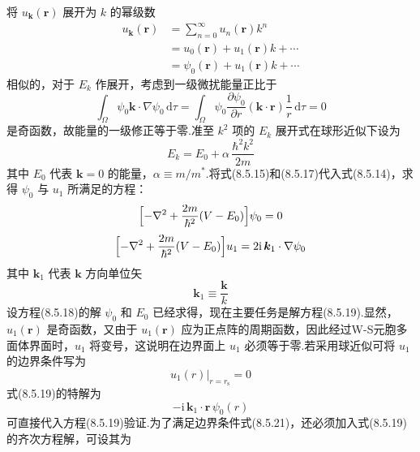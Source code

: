 将 $u_{\boldsymbol{k}}(\boldsymbol{r})$ 展开为 $k$ 的幂级数
\begin{equation}
\begin{aligned}
  u_{\boldsymbol{k}}(\boldsymbol{r})&=\sum_{n=0}^{\infty}u_{n}(\boldsymbol{r})k^{n}\\
  &=u_{0}(\boldsymbol{r})+u_{1}(\boldsymbol{r})k+\cdots\\
  &=\psi_{0}(\boldsymbol{r})+u_{1}(\boldsymbol{r})k+\cdots
\end{aligned}
\end{equation}
相似的，对于 $E_{k}$ 作展开，考虑到一级微扰能量正比于
\begin{equation}
  \int_{\Omega}\psi_{0}\boldsymbol{k}\cdot\nabla\psi_{0}\,\mathrm{d}\tau
  =\int_{\Omega}\psi_{0}\frac{\partial\psi_{0}}{\partial r}(\boldsymbol{k}\cdot\boldsymbol{r})\frac{1}{r}\,\mathrm{d}\tau=0
\end{equation}
是奇函数，故能量的一级修正等于零.准至 $k^{2}$ 项的 $E_{k}$ 展开式在球形近似下设为
\begin{equation}
  E_{k}=E_{0}+\alpha\,\frac{\hbar^{2}k^{2}}{2m}
\end{equation}
其中 $E_{0}$ 代表 $\boldsymbol{k}=0$ 的能量，$\alpha\equiv m/m^{*}$.将式(8.5.15)和(8.5.17)代入式(8.5.14)，求得 $\psi_{0}$ 与 $u_{1}$ 所满足的方程：
\begin{equation}
  \Bigl[-\nabla^{2}+\frac{2m}{\hbar^{2}}(V-E_{0})\Bigr]\psi_{0}=0
\end{equation}
\begin{equation}
  \Bigl[-\nabla^{2}+\frac{2m}{\hbar^{2}}(V-E_{0})\Bigr]u_{1}=2\mathrm{i}\,\boldsymbol{k}_{1}\cdot\nabla\psi_{0}
\end{equation}
其中 $\boldsymbol{k}_{1}$ 代表 $\boldsymbol{k}$ 方向单位矢
\begin{equation}
  \boldsymbol{k}_{1}\equiv\frac{\boldsymbol{k}}{k}
\end{equation}
设方程(8.5.18)的解 $\psi_{0}$ 和 $E_{0}$ 已经求得，现在主要任务是解方程(8.5.19).显然，$u_{1}(\boldsymbol{r})$ 是奇函数，又由于 $u_{1}(\boldsymbol{r})$ 应为正点阵的周期函数，因此经过W-S元胞多面体界面时，$u_{1}$ 将变号，这说明在边界面上 $u_{1}$ 必须等于零.若采用球近似可将 $u_{1}$ 的边界条件写为
\begin{equation}
  u_{1}(r)\Big|_{r=r_{\mathrm{s}}}=0
\end{equation}
式(8.5.19)的特解为
\begin{equation}
  -\mathrm{i}\,\boldsymbol{k}_{1}\cdot\boldsymbol{r}\,\psi_{0}(r)
\end{equation}
可直接代入方程(8.5.19)验证.为了满足边界条件式(8.5.21)，还必须加入式(8.5.19)的齐次方程解，可设其为
